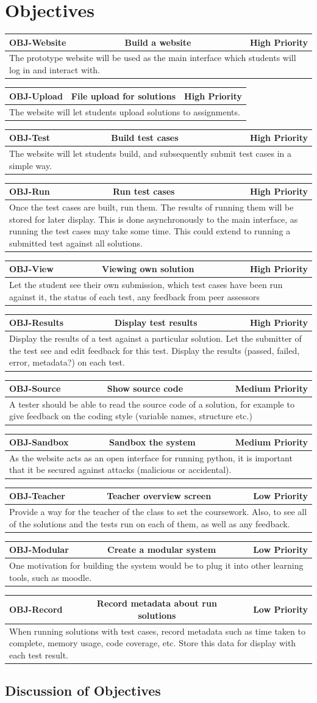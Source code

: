\documentclass[a4paper,11pt]{report}
\newcommand{\objitem}[4]{\begin{tabularx}{\textwidth}{|l|cr|} \hline \textbf{OBJ-#1} & #2 & #3 \\ \hline \multicolumn{3}{|X|}{#4} \\ \hline \end{tabularx}}
\begin{document}
\section{Objectives}
\objitem{Website}{Build a website}{High Priority}{The prototype website will be used as the main interface which students will log in and interact with.}
\objitem{Upload}{File upload for solutions}{High Priority}{The website will let students upload solutions to assignments.}
\objitem{Test}{Build test cases}{High Priority}{The website will let students build, and subsequently submit test cases in a simple way.}
\objitem{Run}{Run test cases}{High Priority}{Once the test cases are built, run them. The results of running them will be stored for later display. This is done asynchronously to the main interface, as running the test cases may take some time. This could extend to running a submitted test against all solutions.}
\objitem{View}{Viewing own solution}{High Priority}{Let the student see their own submission, which test cases have been run against it, the status of each test, any feedback from peer assessors}
\objitem{Results}{Display test results}{High Priority}{Display the results of a test against a particular solution. Let the submitter of the test see and edit feedback for this test. Display the results (passed, failed, error, metadata?) on each test.}
\objitem{Source}{Show source code}{Medium Priority}{A tester should be able to read the source code of a solution, for example to give feedback on the coding style (variable names, structure etc.)}
\objitem{Sandbox}{Sandbox the system}{Medium Priority}{As the website acts as an open interface for running python, it is important that it be secured against attacks (malicious or accidental).}
\objitem{Teacher}{Teacher overview screen}{Low Priority}{Provide a way for the teacher of the class to set the coursework. Also, to see all of the solutions and the tests run on each of them, as well as any feedback.}
\objitem{Modular}{Create a modular system}{Low Priority}{One motivation for building the system would be to plug it into other learning tools, such as moodle.}
\objitem{Record}{Record metadata about run solutions}{Low Priority}{When running solutions with test cases, record metadata such as time taken to complete, memory usage, code coverage, etc. Store this data for display with each test result.}

\subsection{Discussion of Objectives}
\end{document}
